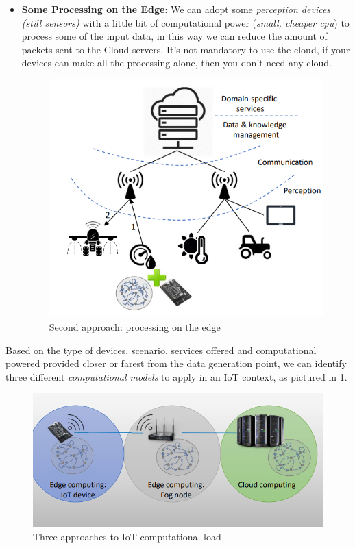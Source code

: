 \documentclass[10pt,a4paper]{report}
\theoremstyle{definition}
\begin{document}
\begin{itemize}
	\item \textbf{Some Processing on the Edge}:
	We can adopt some \textit{perception devices (still sensors)} with a little bit of computational power (\textit{small, cheaper cpu}) to process some of the input data, in this way we can reduce the amount of packets sent to the Cloud servers. It's not mandatory to use the cloud, if your devices can make all the processing alone, then you don't need any cloud.
	\begin{figure}[h]
		\centering
		\includegraphics[scale=0.50]{images/Pasted image 20230222185842.png}
		\caption{Second approach: processing on the edge}
	\end{figure}
\end{itemize}


Based on the type of devices, scenario, services offered and computational powered provided closer or farest from the data generation point, we can identify three different \textit{computational models} to apply in an IoT context, as pictured in \ref{scenario1}.

\begin{figure}[h!]
	\centering
	\includegraphics[scale=0.40]{images/Pasted image 20230222191530.png}
	\caption{Three approaches to IoT computational load}
	\label{scenario1}
\end{figure}
\end{document}
